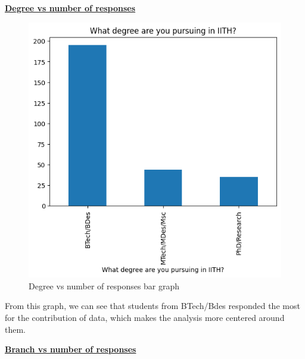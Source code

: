 \documentclass{article}
\begin{document}
\pagebreak
\centerline{\underline{\bfseries{ Degree vs number of responses}}}

\begin{figure}[H]
    \centering
    \includegraphics[scale = 0.7]{bar_degree.png}
    \caption{Degree vs number of responses bar graph}  
    \label{fig:Normality_plot}
\end{figure}
From this graph, we can see that students from BTech/Bdes responded the most for the contribution of data, which makes the analysis more centered around them.

\centerline{\underline{\bfseries{Branch vs number of responses}}}
\end{document}
